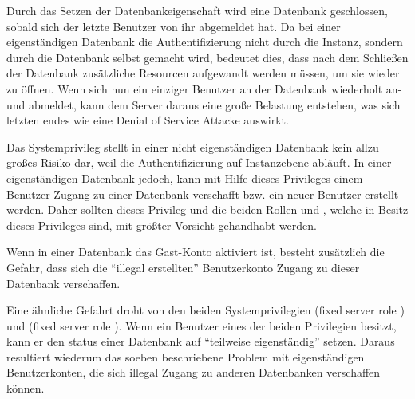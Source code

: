             Durch das Setzen der Datenbankeigenschaft 
            wird eine Datenbank geschlossen, sobald sich der letzte Benutzer von
            ihr abgemeldet hat. Da bei einer eigenständigen Datenbank die
            Authentifizierung nicht durch die Instanz, sondern durch die
            Datenbank selbst gemacht wird, bedeutet dies, dass nach dem
            Schließen der Datenbank zusätzliche Resourcen aufgewandt werden
            müssen, um sie wieder zu öffnen. Wenn sich nun ein einziger Benutzer
            an der Datenbank wiederholt an- und abmeldet, kann dem Server daraus
            eine große Belastung entstehen, was sich letzten endes wie eine
            Denial of Service Attacke auswirkt.
            
            Das Systemprivileg  stellt in einer nicht
            eigenständigen Datenbank kein allzu großes Risiko dar, weil die
            Authentifizierung auf Instanzebene abläuft. In einer eigenständigen
            Datenbank jedoch, kann mit Hilfe dieses Privileges einem Benutzer
            Zugang zu einer Datenbank verschafft bzw. ein neuer Benutzer
            erstellt werden. Daher sollten dieses Privileg und die beiden Rollen
             und , welche in
            Besitz dieses Privileges sind, mit größter Vorsicht gehandhabt werden.
            \begin{merke}
              Wenn in einer Datenbank das Gast-Konto aktiviert ist, besteht
              zusätzlich die Gefahr, dass sich die \enquote{illegal erstellten}
              Benutzerkonto Zugang zu dieser Datenbank verschaffen.
            \end{merke}
            Eine ähnliche Gefahrt droht von den beiden Systemprivilegien
             (fixed server role
            ) und  (fixed
            server role ). Wenn ein Benutzer eines der
            beiden Privilegien besitzt, kann er den status einer Datenbank auf
            \enquote{teilweise eigenständig} setzen. Daraus resultiert wiederum
            das soeben beschriebene Problem mit eigenständigen Benutzerkonten,
            die sich illegal Zugang zu anderen Datenbanken verschaffen können.
            \begin{literaturinternet}
              \item \cite{ff929055}
            \end{literaturinternet}
